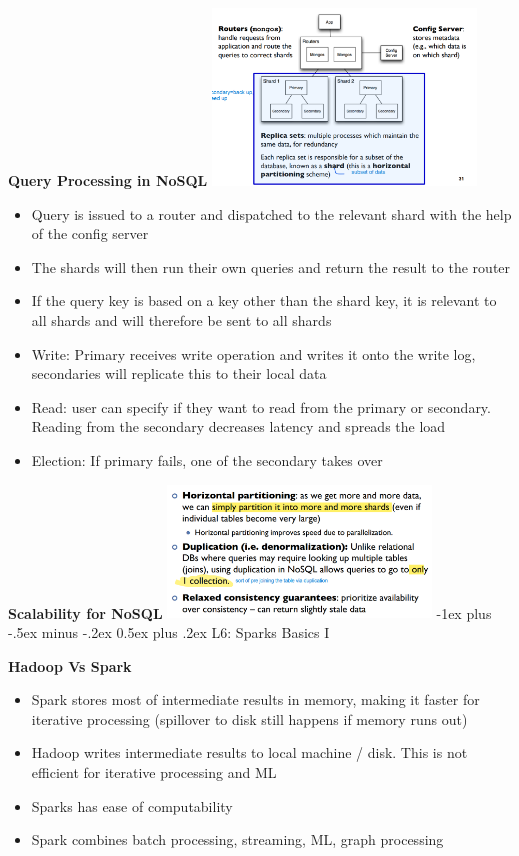 \documentclass[10pt, landscape]{article}
\makeatletter
\renewcommand{\section}{\@startsection{section}{1}{0mm}%
                                {-1ex plus -.5ex minus -.2ex}%
                                {0.5ex plus .2ex}%
                                {\normalfont\large\bfseries}}
\makeatother
\begin{document}
\begin{multicols}{4}
\textbf{Query Processing in NoSQL}
\includegraphics*[width=7cm]{architecture_mongo_db.png}
\begin{itemize}
  \item Query is issued to a router and dispatched to the relevant shard with the help of the config server 
  \item The shards will then run their own queries and return the result to the router 
  \item If the query key is based on a key other than the shard key, it is relevant to all shards and will therefore be sent to all shards 
  \item Write: Primary receives write operation and writes it onto the write log, secondaries will replicate this to their local data 
  \item Read: user can specify if they want to read from the primary or secondary. Reading from the secondary decreases latency and spreads the load 
  \item Election: If primary fails, one of the secondary takes over
\end{itemize}

\textbf{Scalability for NoSQL}
\includegraphics*[width=7cm]{scalability for nosql.png}
\section{L6: Sparks Basics I}

\textbf{Hadoop Vs Spark}
\begin{itemize}
  \item Spark stores most of intermediate results in memory, making it faster for iterative processing (spillover to disk still happens if memory runs out)
  \item Hadoop writes intermediate results to local machine / disk. This is not efficient for iterative processing and ML 
  \item Sparks has ease of computability
  \item Spark combines batch processing, streaming, ML, graph processing 
\end{itemize}


\end{multicols}
\end{document}
